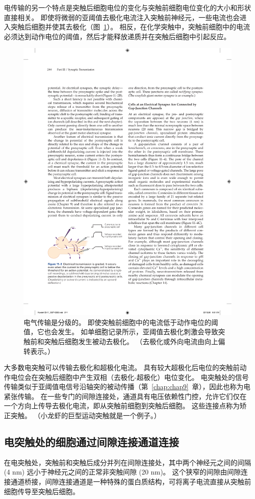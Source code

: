 电传输的另一个特点是突触后细胞电位的变化与突触前细胞电位变化的大小和形状直接相关。
即使将微弱的亚阈值去极化电流注入突触前神经元，一些电流也会进入突触后细胞并使其去极化（图~\ref{fig:11_3}）。
相反，在化学突触中，突触前细胞中的电流必须达到动作电位的阈值，然后才能释放递质并在突触后细胞中引起反应。


\begin{figure}[htbp]
	\centering
	\includegraphics[width=0.5\linewidth]{chap11/fig_11_3}
	\caption{电气传输是分级的。 即使突触前细胞中的电流低于动作电位的阈值，它也会发生。 如单细胞记录所示，亚阈值去极化刺激会导致突触前和突触后细胞发生被动去极化。 （去极化或外向电流由向上偏转表示。）}
	\label{fig:11_3}
\end{figure}


大多数电突触可以传输去极化和超极化电流。
具有较大超极化后电位的突触前动作电位会在突触后细胞中产生双相（去极化-超极化）电位变化。
电突触处的信号传输类似于亚阈值电信号沿轴突的被动传播（第~\ref{chap:chap9}~章），因此也称为电紧张传输。
在一些专门的间隙连接处，通道具有电压依赖性门控，允许它们仅在一个方向上传导去极化电流，即从突触前细胞到突触后细胞。
这些连接点称为矫正突触。 （小龙虾的巨型运动突触就是一个例子。）



\subsection{电突触处的细胞通过间隙连接通道连接}

在电突触处，突触前和突触后成分并列在间隙连接处，其中两个神经元之间的间隔 (4 nm) 远小于神经元之间的正常非突触间隙 (20 nm)。
这个狭窄的间隙由间隙连接通道桥接，间隙连接通道是一种特殊的蛋白质结构，可将离子电流直接从突触前细胞传导至突触后细胞。


